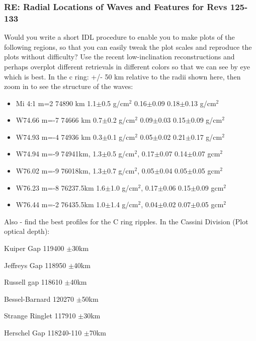 \documentclass[crop=false,class=article,oneside]{standalone}
\begin{document}
\subsubsection{\footnotesize RE: Radial Locations of Waves and Features for Revs 125-133}
Would you write a short IDL procedure to enable you to make plots of the following regions, so that you can easily tweak the plot scales and reproduce the plots without difficulty? Use the recent low-inclination reconstructions and perhaps overplot different retrievals in different colors so that we can see by eye which is best. In the c ring: +/- 50 km relative to the radii shown here, then zoom in to see the structure of the waves:
\begin{itemize}
    \item Mi 4:1 m=2  74890 km  1.1$\pm$0.5 g/$\textrm{cm}^2$  0.16$\pm$0.09  0.18$\pm$0.13 g/$\textrm{cm}^2$
    \item W74.66 m=-7 74666 km  0.7$\pm$0.2 g/$\textrm{cm}^2$  0.09$\pm$0.03  0.15$\pm$0.09 g/$\textrm{cm}^2$
    \item W74.93 m=-4 74936 km  0.3$\pm$0.1 g/$\textrm{cm}^2$  0.05$\pm$0.02  0.21$\pm$0.17 g/$\textrm{cm}^2$
    \item W74.94 m=-9 74941km,  1.3$\pm$0.5 g/$\textrm{cm}^2$, 0.17$\pm$0.07  0.14$\pm$0.07 g$\textrm{cm}^2$
    \item W76.02 m=-9 76018km,  1.3$\pm$0.7 g/$\textrm{cm}^2$, 0.05$\pm$0.04  0.05$\pm$0.05 g$\textrm{cm}^2$
    \item W76.23 m=-8 76237.5km 1.6$\pm$1.0 g/$\textrm{cm}^2$, 0.17$\pm$0.06  0.15$\pm$0.09 g$\textrm{cm}^2$
    \item W76.44 m=-2 76435.5km 1.0$\pm$1.4 g/$\textrm{cm}^2$, 0.04$\pm$0.02  0.07$\pm$0.05 g$\textrm{cm}^2$
\end{itemize}
Also - find the best profiles for the C ring ripples. In the Cassini Division (Plot optical depth):
\begin{itemize}
\begin{multicols}{3}
    \item Kuiper Gap 119400 $\pm$30km
    \item Jeffreys Gap 118950 $\pm$40km
    \item Russell gap 118610 $\pm$40km
    \item Bessel-Barnard 120270 $\pm$50km
    \item Strange Ringlet 117910 $\pm$30km
    \item Herschel Gap 118240-110 $\pm$70km
\end{multicols}
\end{itemize}
\end{document}
